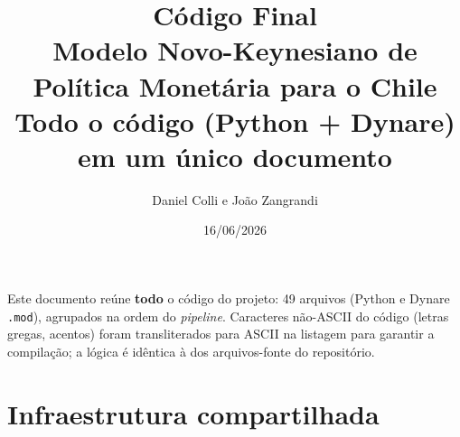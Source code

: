 \documentclass[9pt]{extarticle}
\title{\textbf{C\'odigo Final}\\[2mm]\large Modelo Novo-Keynesiano de Pol\'itica
Monet\'aria para o Chile\\\normalsize Todo o c\'odigo (Python + Dynare) em um
\'unico documento}
\author{Daniel Colli e Jo\~ao Zangrandi}
\date{16/06/2026}
\begin{document}
\maketitle
{\small Este documento re\'une \textbf{todo} o c\'odigo do projeto: 49
arquivos (Python e Dynare \texttt{.mod}), agrupados na ordem do \emph{pipeline}.
Caracteres n\~ao-ASCII do c\'odigo (letras gregas, acentos) foram transliterados
para ASCII na listagem para garantir a compila\c{c}\~ao; a l\'ogica \'e id\^entica
\`a dos arquivos-fonte do reposit\'orio.\par}
\tableofcontents
\clearpage

\part*{Infraestrutura compartilhada}
\end{document}

